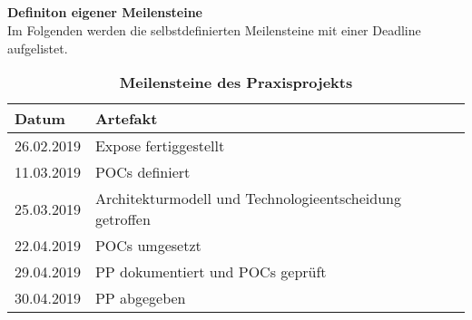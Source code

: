 \documentclass[12pt,titlepage]{scrartcl}
\begin{document}
\\ \\ \\ \\
\textbf{Definiton eigener Meilensteine} \\
Im Folgenden werden die selbstdefinierten Meilensteine mit einer Deadline aufgelistet.
\begin{table}[H]
\centering
\caption{\textbf{Meilensteine des Praxisprojekts}}
\begin{tabular}{|c|l|}
\hline
\multicolumn{1}{|l|}{\textbf{Datum}} & {\textbf{Artefakt}} \\ \hline
26.02.2019                                 & Expose fertiggestellt \\ \hline
11.03.2019                                 & POCs definiert\\ \hline
25.03.2019                                       & Architekturmodell und Technologieentscheidung getroffen \\ \hline
22.04.2019                                       & POCs umgesetzt                                  \\ \hline
29.04.2019                                       & PP dokumentiert und POCs geprüft                                \\ \hline
30.04.2019                                       & PP abgegeben\\ \hline
\end{tabular}
\end{table}

\newpage


 	
\end{document}
